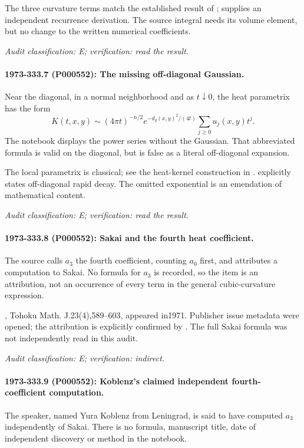 The three curvature terms match the established result of \citet[\S7]{mckeansinger1967curvature}; \citet[introduction and \S4]{gilkey1979recursion} supplies an independent recurrence derivation. The source integral needs its volume element, but no change to the written numerical coefficients.

\emph{Audit classification: E; verification: read the result.}

\paragraph{1973-333.7 (P000552): The missing off-diagonal Gaussian.}
Near the diagonal, in a normal neighborhood and as \(t\downarrow0\), the heat parametrix has the form \[K(t,x,y)\sim(4\pi t)^{-n/2}e^{-d_g(x,y)^2/(4t)}\sum_{j\ge0}u_j(x,y)t^j.\] The notebook displays the power series without the Gaussian. That abbreviated formula is valid on the diagonal, but is false as a literal off-diagonal expansion.

The local parametrix is classical; see the heat-kernel construction in \citet{mckeansinger1967curvature}. \citet[introduction, p.~202]{gilkey1979recursion} explicitly states off-diagonal rapid decay. The omitted exponential is an emendation of mathematical content.

\emph{Audit classification: E; verification: read the result.}

\paragraph{1973-333.8 (P000552): Sakai and the fourth heat coefficient.}
The source calls \(a_3\) the fourth coefficient, counting \(a_0\) first, and attributes a computation to Sakai. No formula for \(a_3\) is recorded, so the item is an attribution, not an occurrence of every term in the general cubic-curvature expression.

\citet{sakai1971eigenvalues}, Tohoku Math. J.23(4),589--603, appeared in1971. Publisher issue metadata were opened; the attribution is explicitly confirmed by \citet[introduction]{gilkey1979recursion}. The full Sakai formula was not independently read in this audit.

\emph{Audit classification: E; verification: indirect.}

\paragraph{1973-333.9 (P000552): Koblenz’s claimed independent fourth-coefficient computation.}
The speaker, named Yura Koblenz from Leningrad, is said to have computed \(a_3\) independently of Sakai. There is no formula, manuscript title, date of independent discovery or method in the notebook.

